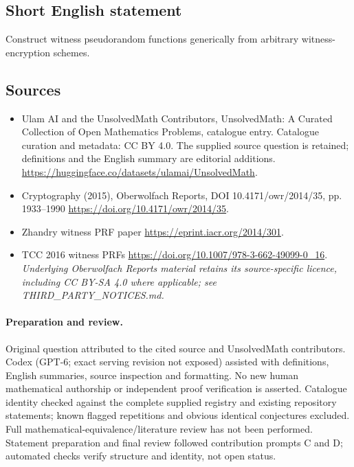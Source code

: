 \documentclass[11pt]{article}
\begin{document}
\subsection{Short English statement}
Construct witness pseudorandom functions generically from arbitrary witness-encryption schemes.
\subsection{Sources}
\begin{itemize}
\item[\hypertarget{source:statement:1}{S1}] Ulam AI and the UnsolvedMath Contributors, UnsolvedMath: A Curated Collection of Open Mathematics Problems, catalogue entry. Catalogue curation and metadata: CC BY 4.0. The supplied source question is retained; definitions and the English summary are editorial additions.
\url{https://huggingface.co/datasets/ulamai/UnsolvedMath}.
\item[\hypertarget{source:statement:2}{S2}] Cryptography (2015), Oberwolfach Reports, DOI 10.4171/owr/2014/35, pp. 1933--1990
\url{https://doi.org/10.4171/owr/2014/35}.
\item[\hypertarget{source:statement:3}{S3}] Zhandry witness PRF paper
\url{https://eprint.iacr.org/2014/301}.
\item[\hypertarget{source:statement:4}{S4}] TCC 2016 witness PRFs
\url{https://doi.org/10.1007/978-3-662-49099-0_16}.
\textit{Underlying Oberwolfach Reports material retains its source-specific licence, including CC BY-SA 4.0 where applicable; see THIRD\_PARTY\_NOTICES.md.}
\end{itemize}
\paragraph{Preparation and review.}
Original question attributed to the cited source and UnsolvedMath contributors. Codex (GPT-6; exact serving revision not exposed) assisted with definitions, English summaries, source inspection and formatting. No new human mathematical authorship or independent proof verification is asserted. Catalogue identity checked against the complete supplied registry and existing repository statements; known flagged repetitions and obvious identical conjectures excluded. Full mathematical-equivalence/literature review has not been performed. Statement preparation and final review followed contribution prompts C and D; automated checks verify structure and identity, not open status.
\label{end:statement}
\end{document}
